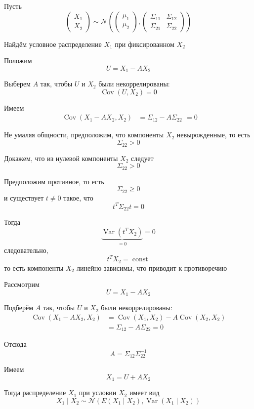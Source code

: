 \documentclass[12pt,a4paper]{article}
\begin{document}
\begin{example}

Пусть
\[
\begin{pmatrix}
X_1\\
X_2
\end{pmatrix}
\sim
\mathcal{N}
\left(
\begin{pmatrix}
\mu_1\\
\mu_2
\end{pmatrix},
\begin{pmatrix}
\Sigma_{11} & \Sigma_{12}\\
\Sigma_{21} & \Sigma_{22}
\end{pmatrix}
\right)
\]

Найдём условное распределение $X_1$ при фиксированном $X_2$

Положим
\[
U=X_1-AX_2
\]

Выберем $A$ так, чтобы $U$ и $X_2$ были некоррелированы:
\[
\operatorname{Cov}(U,X_2)=0
\]

Имеем
\[
\begin{aligned}
\operatorname{Cov}(X_1-AX_2,X_2)
&=
\Sigma_{12}-A\Sigma_{22}
\end{aligned} = 0
\]

Не умаляя общности, предположим, что компоненты $X_2$ невырожденные, то есть
\[
\Sigma_{22}>0
\]

Докажем, что из нулевой компоненты $X_2$ следует
\[
\Sigma_{22}>0
\]

Предположим противное, то есть
\[
\Sigma_{22}\geq 0
\]
и существует $t\neq 0$ такое, что
\[
t^T\Sigma_{22}t=0
\]

Тогда
\[
\underbrace{\operatorname{Var}(t^TX_2)}_{=0}=0
\]
следовательно,
\[
t^TX_2=\operatorname{const}
\]
то есть компоненты $X_2$ линейно зависимы, что приводит к противоречию

Рассмотрим
\[
U=X_1-AX_2
\]

Подберём $A$ так, чтобы $U$ и $X_2$ были некоррелированы:
\[
\begin{aligned}
\operatorname{Cov}(X_1-AX_2,X_2)
&=
\operatorname{Cov}(X_1,X_2)
-
A\operatorname{Cov}(X_2,X_2)\\
&=
\Sigma_{12}-A\Sigma_{22}
=
0
\end{aligned}
\]

Отсюда
\[
A=\Sigma_{12}\Sigma_{22}^{-1}
\]

Имеем
\[
X_1=U+AX_2
\]

Тогда распределение $X_1$ при условии $X_2$ имеет вид
\[
X_1\mid X_2
\sim
\mathcal{N}
\left(
E(X_1\mid X_2),
\operatorname{Var}(X_1\mid X_2)
\right)
\]


\end{example}
\end{document}
